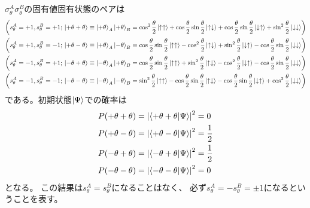 \documentclass[../../sp_2019.tex]{subfiles}
\begin{document}
\subsection{}
\(\sigma_\theta^A\sigma_\theta^B\)の固有値固有状態のペアは
\begin{equation}\begin{aligned}[b]
    &\qty(s_\theta^A = +1,s_\theta^B = +1;\,\ket{+\theta+\theta} \equiv \ket{+\theta}_A\ket{+\theta}_B
        =\cos^2\frac{\theta}{2}\ket{\uparrow\uparrow}+\cos\frac{\theta}{2}\sin\frac{\theta}{2}\ket{\uparrow\downarrow}
        +\cos\frac{\theta}{2}\sin\frac{\theta}{2}\ket{\downarrow\uparrow}+\sin^2\frac{\theta}{2}\ket{\downarrow\downarrow})\\
    &\qty(s_\theta^A = +1,s_\theta^B = -1;\,\ket{+\theta-\theta} \equiv \ket{+\theta}_A\ket{-\theta}_B
        =\cos\frac{\theta}{2}\sin\frac{\theta}{2}\ket{\uparrow\uparrow}-\cos^2\frac{\theta}{2}\ket{\uparrow\downarrow}
        +\sin^2\frac{\theta}{2}\ket{\downarrow\uparrow}-\cos\frac{\theta}{2}\sin\frac{\theta}{2}\ket{\downarrow\downarrow})\\
    &\qty(s_\theta^A = -1,s_\theta^B = +1;\,\ket{-\theta+\theta} \equiv \ket{-\theta}_A\ket{+\theta}_B
        =\cos\frac{\theta}{2}\sin\frac{\theta}{2}\ket{\uparrow\uparrow}+\sin^2\frac{\theta}{2}\ket{\uparrow\downarrow}
        -\cos^2\frac{\theta}{2}\ket{\downarrow\uparrow}-\cos\frac{\theta}{2}\sin\frac{\theta}{2}\ket{\downarrow\downarrow})\\
    &\qty(s_\theta^A = -1,s_\theta^B = -1;\,\ket{-\theta-\theta} \equiv \ket{-\theta}_A\ket{-\theta}_B
        =\sin^2\frac{\theta}{2}\ket{\uparrow\uparrow}-\cos\frac{\theta}{2}\sin\frac{\theta}{2}\ket{\uparrow\downarrow}
        -\cos\frac{\theta}{2}\sin\frac{\theta}{2}\ket{\downarrow\uparrow}+\cos^2\frac{\theta}{2}\ket{\downarrow\downarrow})
\end{aligned}\end{equation}
である。初期状態\(\ket{\Psi}\)での確率は
\begin{equation}\begin{aligned}[b]
    P(+\theta+\theta) &= \abs{\braket{+\theta+\theta}{\Psi}}^2 = 0\\
    P(+\theta-\theta) &= \abs{\braket{+\theta-\theta}{\Psi}}^2 = \frac{1}{2}\\
    P(-\theta+\theta) &= \abs{\braket{-\theta+\theta}{\Psi}}^2 = \frac{1}{2}\\
    P(-\theta-\theta) &= \abs{\braket{-\theta-\theta}{\Psi}}^2 = 0
\end{aligned}\end{equation}
となる。
この結果は\(s_\theta^A=s_\theta^B\)になることはなく、
必ず\(s_\theta^A=-s_\theta^B=\pm 1\)になるということを表す。
\end{document}
